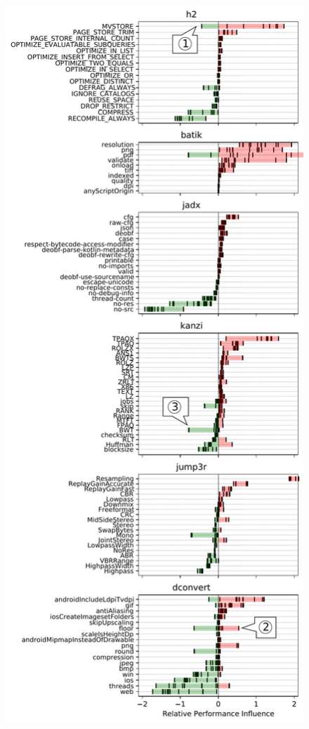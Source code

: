 {\begin{figure}
	\includegraphics[width=0.9999\linewidth]{images/out_annotated2.pdf}

\end{figure}}
